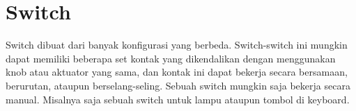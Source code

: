 \section{Switch}
\label{sec:switch}

Switch dibuat dari banyak konfigurasi yang berbeda. Switch-switch ini mungkin dapat memiliki beberapa set kontak yang dikendalikan dengan menggunakan knob atau aktuator yang sama, dan kontak ini dapat bekerja secara bersamaan, berurutan, ataupun berselang-seling. Sebuah switch mungkin saja bekerja secara manual. Misalnya saja sebuah switch untuk lampu ataupun tombol di keyboard.
